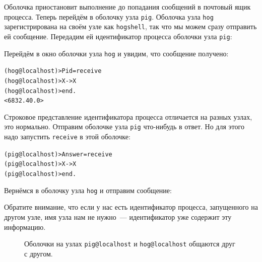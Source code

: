 \documentclass[
  paper=a4,
  fontsize=14pt,
  openany,
  appendixprefix=true
]{scrbook}
\begin{document}
Оболочка приостановит выполнение до попадания сообщений в почтовый ящик процесса. Теперь перейдём в оболочку узла \lstinline{pig}. Оболочка узла \lstinline{hog} зарегистрирована на своём узле как \lstinline{hogshell}, так что мы можем сразу отправить ей сообщение. Передадим ей идентификатор процесса оболочки узла \lstinline{pig}:


Перейдём в окно оболочки узла \lstinline{hog} и увидим, что сообщение получено:

\begin{alltt}
(hog@localhost)> Pid = receive
(hog@localhost)>           X -> X
(hog@localhost)>       end.
<6832.40.0>
\end{alltt}
\addtocounter{erlcommand}{1}
%

Строковое представление идентификатора процесса отличается на разных узлах, это нормально. Отправим оболочке узла \lstinline{pig} что-нибудь в ответ. Но для этого надо запустить \lstinline{receive} в этой оболочке:

\begin{alltt}
(pig@localhost)> Answer = receive
(pig@localhost)>              X -> X
(pig@localhost)>          end.
\end{alltt}
\addtocounter{erlcommand}{1}
%

Вернёмся в оболочку узла \lstinline{hog} и отправим сообщение:


Обратите внимание, что если у нас есть идентификатор процесса, запущенного на другом узле, имя узла нам не нужно~--- идентификатор уже содержит эту информацию.

\begin{figure}[!t,hellodistr]
  \centering
  \begin{sequencediagram}



  \end{sequencediagram}
  \caption{Оболочки на узлах \lstinline{pig@localhost} и \lstinline{hog@localhost} общаются друг с другом.}
  \label{hellodistr}
\end{figure}
\end{document}
